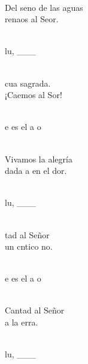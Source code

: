 \begin{cancion}
	\jump\\
Del seno de las aguas\\
	renaos al Seor.\\\jump\\
	\begin{chorus}%
	lu, ___\\
	\end{chorus}%
	\jump\\
	cua sagrada.\\
	¡Caemos al Sor!\\\jump\\
	\begin{chorus}%
	e es el a  o \\
	\end{chorus}%
	\jump\\
Vivamos la alegría\\
	dada a  en el dor.\\\jump\\
	\begin{chorus}%
	lu, ___\\
	\end{chorus}%
	\jump\\
	tad al Señor\\
	un cntico no.\\\jump\\
	\begin{chorus}%
	e es el a  o \\
	\end{chorus}%
	\jump\\
Cantad al Señor\\
	a la erra.\\\jump\\
	\begin{chorus}%
	lu, ___\\
	\end{chorus}%
	\jump\\

\end{cancion}
